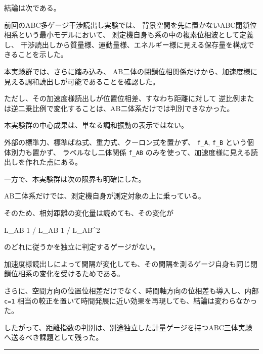 \documentclass[
]{article}
\newenvironment{Shaded}{}{}
\newcommand{\NormalTok}[1]{#1}
\begin{document}
結論は次である。

\begin{Shaded}
\begin{Highlighting}[]
\NormalTok{前回のABC多ゲージ干渉読出し実験では、}
\NormalTok{背景空間を先に置かないABC閉鎖位相系という最小モデルにおいて、}
\NormalTok{測定機自身も系の中の複素位相波として定義し、}
\NormalTok{干渉読出しから質量様、運動量様、エネルギー様に見える保存量を構成できることを示した。}

\NormalTok{本実験群では、さらに踏み込み、}
\NormalTok{AB二体の閉鎖位相関係だけから、加速度様に見える調和読出しが可能であることを確認した。}

\NormalTok{ただし、その加速度様読出しが位置位相差、すなわち距離に対して}
\NormalTok{逆比例または逆二乗比例で変化することは、AB二体系だけでは判別できなかった。}
\end{Highlighting}
\end{Shaded}

本実験群の中心成果は、単なる調和振動の表示ではない。

外部の標準力、標準ばね式、重力式、クーロン式を置かず、 \texttt{f\_A},
\texttt{f\_B} という個体別力も置かず、 ラベルなし二体関係 \texttt{f\_AB}
のみを使って、加速度様に見える読出しを作れた点にある。

一方で、本実験群は次の限界も明確にした。

AB二体系だけでは、測定機自身が測定対象の上に乗っている。

そのため、相対距離の変化量は読めても、その変化が

\begin{Shaded}
\begin{Highlighting}[]
\NormalTok{L\_AB}
\NormalTok{1 / L\_AB}
\NormalTok{1 / L\_AB\^{}2}
\end{Highlighting}
\end{Shaded}

のどれに従うかを独立に判定するゲージがない。

加速度様読出しによって間隔が変化しても、その間隔を測るゲージ自身も同じ閉鎖位相系の変化を受けるためである。

さらに、空間方向の位置位相差だけでなく、時間軸方向の位相差も導入し、内部
\texttt{c=1}
相当の較正を置いて時間発展に近い効果を再現しても、結論は変わらなかった。

したがって、距離指数の判別は、別途独立した計量ゲージを持つABC三体実験へ送るべき課題として残った。

\begin{center}\rule{0.5\linewidth}{0.5pt}\end{center}
\end{document}
